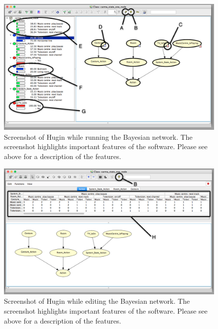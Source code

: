 \begin{figure}[h!]
\centering
\includegraphics[width=\textwidth]{images/hugin-functionality-running}
\caption{Screenshot of Hugin while running the Bayesian network. The screenshot highlights important features of the software. Please see above for a description of the features.}
\label{fig:design:bayesian-network:hugin-functionality-running}
\end{figure}

\begin{figure}[h!]
\centering
\includegraphics[width=\textwidth]{images/hugin-functionality-editing}
\caption{Screenshot of Hugin while editing the Bayesian network. The screenshot highlights important features of the software. Please see above for a description of the features.}
\label{fig:design:bayesian-network:hugin-functionality-editing}
\end{figure}


